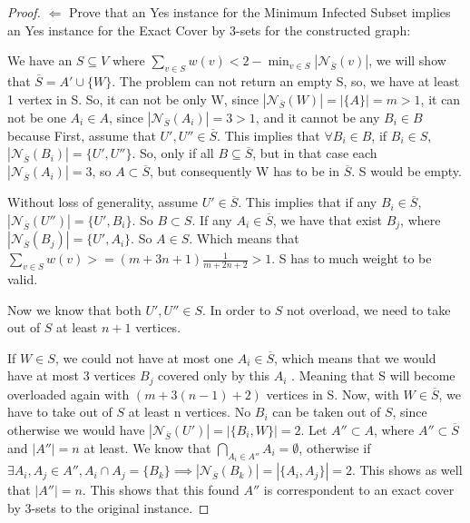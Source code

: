 \begin{proof}
\par
$\Leftarrow$ Prove that an Yes instance for the  Minimum Infected Subset implies an Yes instance for the Exact Cover by 3-sets  for the constructed graph:

We have  an $S \subseteq V $ where $ \displaystyle\sum\limits_{v \in S} w(v)   <  2 -  \min_{v \in S} |\mathcal{N}_{\overline{S}}(v)|$, we will show that  $\overline{S} = A' \cup \{W\}$.
The problem can not return an empty S, so, we have at least 1 vertex in S. So, it can not be only W, since $|\mathcal{N}_{\overline{S}}(W)| = |\{A\}| = m > 1$, it can not be one $A_i \in A$, since $|\mathcal{N}_{\overline{S}}(A_i)| = 3 > 1$, and it cannot be any $B_i \in B$ because 
First, assume that $U', U'' \in \overline{S}$. This implies that $\forall B_i \in B$, if $B_i \in S$,   $|\mathcal{N}_{\overline{S}}(B_i)| = \{U', U''\}$. So, only if all $B \subseteq \overline{S}$, but in that case each $|\mathcal{N}_{\overline{S}}(A_i)| = 3$, so  $A \subset \overline{S}$, but consequently W has to be in $\overline{S}$. S would be empty. 
 
 Without loss of generality, assume $U' \in \overline{S}$. This implies that if any $B_i \in \overline{S}$, $|\mathcal{N}_{\overline{S}}(U'')| = \{U', B_i\}$. So $B \subset S$. If any $A_i \in \overline{S}$, we have that exist $B_j$, where $|\mathcal{N}_{\overline{S}}(B_j)| = \{U', A_i\}$. So $A \in S$. Which means that$ \displaystyle\sum\limits_{v \in S} w(v)  >= ( m + 3n + 1 ) \frac{1}{m + 2n + 2} > 1 $. S has to much weight to be valid.

Now we know that both $U', U'' \in S$. In order to $S$ not overload, we need to take out of $S$ at least $n + 1$ vertices.

If $W \in S$, we could not have at most one  $A_i \in \overline{S}$, which means that we would have at most 3 vertices $B_j$ covered only by this $A_i$ . Meaning that S will become overloaded again with $(m + 3(n - 1) + 2)$ vertices in S.  
Now, with $W \in \overline{S}$, we have to take out of $S$ at least n vertices.
No $B_i$ can be taken out of $S$, since otherwise we would have $|\mathcal{N}_{\overline{S}}(U')| = |\{B_i, W\} | = 2$.
Let $A'' \subset A$, where $A'' \subset \overline{S}$ and $|A''| = n$ at least. We know that $\bigcap_{A_i \in A''} A_i = \emptyset$, otherwise if $\exists A_i, A_j \in A'', A_i \cap A_j = \{ B_k\} \implies |\mathcal{N}_{\overline{S}}(B_k)| = |\{A_i, A_j\}| = 2 $. This shows as well that $|A''| = n$. This shows that this found $A''$ is correspondent to an exact cover by 3-sets to the original instance.
\end{proof}
